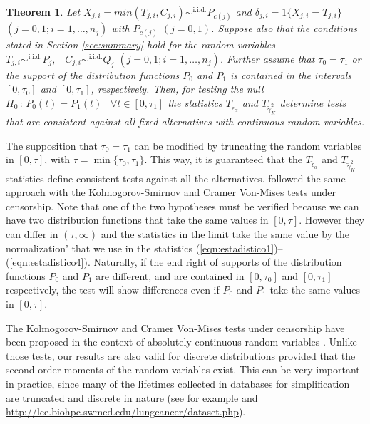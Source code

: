 \documentclass[11pt]{article}
\newtheorem{theorem}{Theorem}
\begin{document}
\begin{theorem}
	\label{thm1}
	Let  $X_{j,i}= min(T_{j,i},C_{j,i})\sim^{ \text{i.i.d.}  } P_{c(j)} $ and  $\delta_{j,i}= 1\{X_{j,i}= T_{j,i}\}$	$(j=0,1; i=1,\dots,n_j)$ with $P_{c(j)}$ $(j=0,1)$. Suppose also that  the conditions  stated in Section \ref{sec:summary} hold  for the random variables $T_{j,i}\sim^{ \text{i.i.d.}  }  P_{j},\,\,\,\,\,C_{j,i} \sim^{ \text{i.i.d.}  }  Q_{j}$ $(j=0,1; i=1,\dots,n_j)$. Further assume that $\tau_0=\tau_1$  or the  support of the distribution functions $P_0$ and $P_1$ is  contained in the intervals $ [0,\tau_0] $ and $[0,\tau_1]$, respectively. Then, 
for testing the null  $H_0  \,:\, P_{0}(t)  =  P_{1}(t) \,\,\,\,\,\forall  t\in [0,\tau_1] $	
	 the statistics $T_{\tilde{\epsilon}_\alpha}$ and   $T_{\tilde{\gamma}_K^{2}}$  determine tests that are consistent against all fixed  alternatives with continuous random variables.
\end{theorem}




	
	The supposition that $\tau_0=\tau_1$ can be modified by truncating the random variables in $[0,\tau]$, with $\tau= \min\{\tau_0,\tau_1\}$. This way,  it is guaranteed that the  $T_{\tilde{\epsilon}_\alpha}$ and   $T_{\tilde{\gamma}_K^{2}}$ statistics define consistent  tests against all the alternatives.  \cite{schumacher1984two} followed the same approach with the Kolmogorov-Smirnov and Cramer Von-Mises tests under censorship. Note that one of the two hypotheses must be verified because  we can have two distribution functions that take the same values in $[0,\tau]$. However they can differ in $(\tau, \infty)$ and the statistics  in the limit take the same value by the  normalization' that we use in the statistics (\ref{eqn:estadistico1})--(\ref{eqn:estadistico4}). Naturally, if the end right of supports of the distribution functions $P_{0}$ and $P_{1}$ are different, and  are contained in $[0,\tau_0]$ and $[0,\tau_1]$ respectively,   the test will show differences even if $P_0$ and $P_1$ take the same values in $[0,\tau]$.
		
	




The Kolmogorov-Smirnov and Cramer Von-Mises tests under censorship have been proposed in the context of absolutely continuous random variables \cite{schumacher1984two}. Unlike those tests, our results are also valid for discrete distributions provided that the second-order moments of the random variables exist. This can be very important in practice, since many of the lifetimes collected in databases for simplification are truncated and discrete in nature (see for example \cite{cai2019lce} and  \url{http://lce.biohpc.swmed.edu/lungcancer/dataset.php}).
\end{document}

